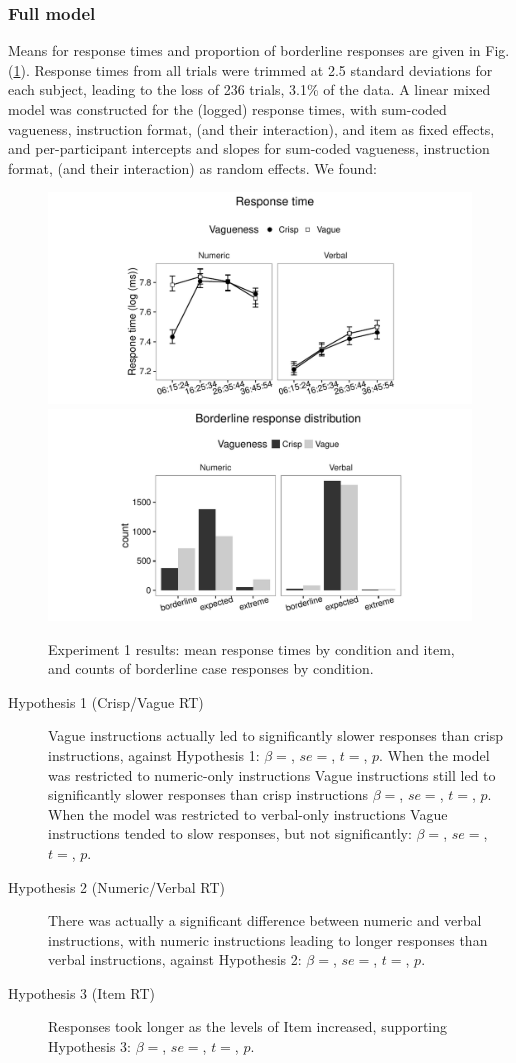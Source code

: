 \subsubsection{Full model}

Means for response times and proportion of borderline responses are given in Fig. (\ref{resultsC-exp-1}). Response times from all trials were trimmed at 2.5 standard deviations for each subject, leading to the loss of 236 trials, 3.1\% of the data. A linear mixed model was constructed for the (logged) response times, with sum-coded vagueness, instruction format, (and their interaction), and item as fixed effects, and per-participant intercepts and slopes for sum-coded vagueness, instruction format, (and their interaction) as random effects. We found:

\begin{figure}[htbp]
\centering
\includegraphics[trim = 20mm 0mm 30mm 0mm, clip, width=.49\textwidth]{figures/Ce1-rtplot-1.pdf}
\includegraphics[trim = 20mm 0mm 25mm 0mm, clip, width=.49\textwidth]{figures/Ce1-blBarChart-1}
\caption{Experiment 1 results: mean response times by condition and item, and counts of borderline case responses by condition.}
\label{resultsC-exp-1}
\end{figure}

\begin{description}
\item [Hypothesis 1 (Crisp/Vague RT)] Vague instructions actually led to significantly slower responses than crisp instructions, against Hypothesis 1: $\beta=$, $se=$, $t=$, $p$. When the model was restricted to numeric-only instructions Vague instructions still led to significantly slower responses than crisp instructions $\beta=$, $se=$, $t=$, $p$. When the model was restricted to verbal-only instructions Vague instructions tended to slow responses, but not significantly: $\beta=$, $se=$, $t=$, $p$.
\item [Hypothesis 2 (Numeric/Verbal RT)] There was actually a significant difference between numeric and verbal instructions, with numeric instructions leading to longer responses than verbal instructions, against Hypothesis 2: $\beta=$, $se=$, $t=$, $p$.
\item [Hypothesis 3 (Item RT)] Responses took longer as the levels of Item increased, supporting Hypothesis 3: $\beta=$, $se=$, $t=$, $p$.
\end{description}

